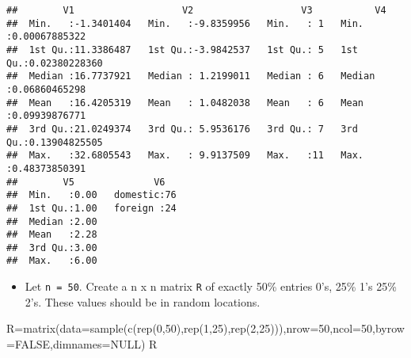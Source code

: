 \documentclass[
]{article}
\newenvironment{Shaded}{\begin{snugshade}}{\end{snugshade}}
\newcommand{\AttributeTok}[1]{\textcolor[rgb]{0.77,0.63,0.00}{#1}}
\newcommand{\ConstantTok}[1]{\textcolor[rgb]{0.00,0.00,0.00}{#1}}
\newcommand{\DecValTok}[1]{\textcolor[rgb]{0.00,0.00,0.81}{#1}}
\newcommand{\FunctionTok}[1]{\textcolor[rgb]{0.00,0.00,0.00}{#1}}
\newcommand{\NormalTok}[1]{#1}
\newcommand{\OtherTok}[1]{\textcolor[rgb]{0.56,0.35,0.01}{#1}}
\providecommand{\tightlist}{%
  \setlength{\itemsep}{0pt}\setlength{\parskip}{0pt}}
\begin{document}
\begin{verbatim}
##        V1                   V2                   V3           V4               
##  Min.   :-1.3401404   Min.   :-9.8359956   Min.   : 1   Min.   :0.00067885322  
##  1st Qu.:11.3386487   1st Qu.:-3.9842537   1st Qu.: 5   1st Qu.:0.02380228360  
##  Median :16.7737921   Median : 1.2199011   Median : 6   Median :0.06860465298  
##  Mean   :16.4205319   Mean   : 1.0482038   Mean   : 6   Mean   :0.09939876771  
##  3rd Qu.:21.0249374   3rd Qu.: 5.9536176   3rd Qu.: 7   3rd Qu.:0.13904825505  
##  Max.   :32.6805543   Max.   : 9.9137509   Max.   :11   Max.   :0.48373850391  
##        V5              V6    
##  Min.   :0.00   domestic:76  
##  1st Qu.:1.00   foreign :24  
##  Median :2.00                
##  Mean   :2.28                
##  3rd Qu.:3.00                
##  Max.   :6.00
\end{verbatim}

\begin{itemize}
\tightlist
\item
  Let \texttt{n\ =\ 50}. Create a n x n matrix \texttt{R} of exactly
  50\% entries 0's, 25\% 1's 25\% 2's. These values should be in random
  locations.
\end{itemize}

\begin{Shaded}
\begin{Highlighting}[]
\NormalTok{R}\OtherTok{=}\FunctionTok{matrix}\NormalTok{(}\AttributeTok{data=}\FunctionTok{sample}\NormalTok{(}\FunctionTok{c}\NormalTok{(}\FunctionTok{rep}\NormalTok{(}\DecValTok{0}\NormalTok{,}\DecValTok{50}\NormalTok{),}\FunctionTok{rep}\NormalTok{(}\DecValTok{1}\NormalTok{,}\DecValTok{25}\NormalTok{),}\FunctionTok{rep}\NormalTok{(}\DecValTok{2}\NormalTok{,}\DecValTok{25}\NormalTok{))),}\AttributeTok{nrow=}\DecValTok{50}\NormalTok{,}\AttributeTok{ncol=}\DecValTok{50}\NormalTok{,}\AttributeTok{byrow=}\ConstantTok{FALSE}\NormalTok{,}\AttributeTok{dimnames=}\ConstantTok{NULL}\NormalTok{)}
\NormalTok{R}
\end{Highlighting}
\end{Shaded}
\end{document}
